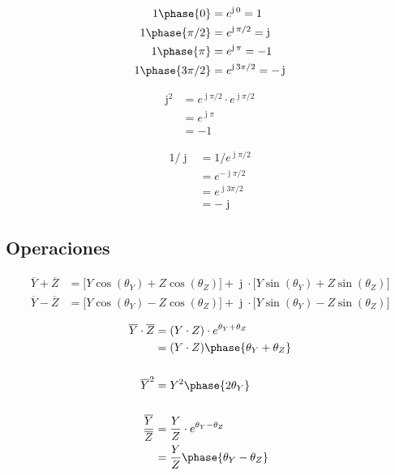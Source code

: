 \documentclass[article, a4paper]{memoir}
\DeclareMathOperator{\ji}{\mathrm{j}}
\begin{document}
\begin{minipage}{0.6\linewidth}
  \begin{align*}
    1\phase{0} &= e^{\ji 0} = 1\\
    1\phase{\pi/2} &= e^{\ji \pi/2} = \ji\\
    1\phase{\pi} &= e^{\ji \pi} = -1\\
    1\phase{3\pi/2} &= e^{\ji 3\pi/2} = -\ji
  \end{align*}
  \begin{minipage}{0.5\linewidth}
      \begin{align*}
        \ji^2 &= e^{\ji \pi/2} \cdot e^{\ji \pi/2}\\
              &= e^{\ji \pi}\\
              &= -1
      \end{align*}
  \end{minipage}
  \begin{minipage}{0.5\linewidth}
      \begin{align*}
        1/\ji &= 1/e^{\ji \pi/2} \\
              &= e^{-\ji \pi/2} \\
              &= e^{\ji 3\pi/2}\\
              &= -\ji
      \end{align*}
  \end{minipage}
\end{minipage}


\vspace{6mm}
\subsection{Operaciones}

\vspace{-5mm}
\begin{align*}
  \overline{Y} + \overline{Z} &= \Big[Y \cos(\theta_Y) + Z \cos(\theta_Z)\Big] + \ji \cdot \Big[Y \sin(\theta_Y) + Z \sin(\theta_Z)\Big]\\
  \overline{Y} - \overline{Z} &= \Big[Y \cos(\theta_Y) - Z \cos(\theta_Z)\Big] + \ji \cdot \Big[Y \sin(\theta_Y) - Z \sin(\theta_Z)\Big]
\end{align*}

\begin{align*}
  \overline{Y} \cdot \overline{Z} &= (Y \cdot Z )\cdot e^{\theta_Y + \theta_Z}\\
                                  &=(Y \cdot Z )\phase{\theta_Y + \theta_Z}\\
  \\
  \overline{Y}^2 &= Y^2\phase{2\theta_Y}\\
  \\
  \frac{\overline{Y}}{\overline{Z}} &= \frac{Y}{Z}\cdot e^{\theta_Y - \theta_Z}\\
                                  &= \frac{Y}{Z}\phase{\theta_Y - \theta_Z}
\end{align*}
\end{document}
